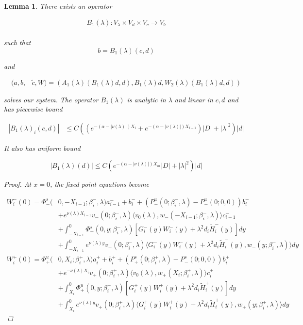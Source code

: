 \documentclass[12pt]{article}
\newtheorem{lemma}{Lemma}
\begin{document}
\begin{lemma}\label{inv3}
There exists an operator

\begin{align*}
B_1(\lambda): V_\lambda \times V_d \times V_c \rightarrow V_b \\
\end{align*}

such that 
\[
b = B_1(\lambda)(c, d)
\]

and

\begin{align*}
(a,b,&\tilde{c}, W) 
= (A_1(\lambda)(B_1(\lambda)d, d), B_1(\lambda)d, W_2(\lambda)(B_1(\lambda)d, d))
\end{align*}

solves our system. The operator $B_1(\lambda)$ is analytic in $\lambda$ and linear in $c, d$ and has piecewise bound

\begin{align*}
|B_1(\lambda)_i(c, d)| &\leq C ( (e^{-(\alpha - |\nu(\lambda)|) X_i} + e^{-(\alpha - |\nu(\lambda)|) X_{i-1}} ) |D| + |\lambda|^2 )|d|
\end{align*}

It also has uniform bound

\begin{equation}
|B_1(\lambda)(d)| \leq C ( e^{-(\alpha - |\nu(\lambda)|) X_m} |D| + |\lambda|^2 )|d|
\end{equation}

\begin{proof}

At $x = 0$, the fixed point equations become

\begin{align*}
W_i^-(0) = \Phi^s_-(&0, -X_{i-1}; \beta_i^-, \lambda)a_{i-1}^- + b_i^- + (P^u_-(0; \beta_i^-, \lambda) - P^u_-(0; 0, 0))b_i^- \\
&+ e^{\nu(\lambda)X_{i-1}} v_-(0; \beta_i^-, \lambda) \langle v_0(\lambda), w_-(-X_{i-1}; \beta_i^-, \lambda) \rangle c_{i-1}^- \\
&+ \int_{-X_{i-1}}^0 \Phi^s_-(0, y; \beta_i^-, \lambda) [ G_i^-(y)W_i^-(y) + \lambda^2 d_i \tilde{H}_i^-(y) ] dy \\
&+ \int_{-X_{i-1}}^0
e^{\nu(\lambda)y} v_-(0; \beta_i^-, \lambda) \langle G_i^-(y)W_i^-(y) + \lambda^2 d_i \tilde{H}_i^-(y), w_-(y; \beta_i^-, \lambda) \rangle dy \\
W_i^+(0) = \Phi^u_+(&0, X_i; \beta_i^+, \lambda)a_i^+ + b_i^+ + (P^s_+(0; \beta_i^+, \lambda) - P^s_-(0; 0, 0))b_i^+ \\
&+ e^{-\nu(\lambda) X_i} v_+(0; \beta_i^+, \lambda) \langle v_0(\lambda), w_+(X_i; \beta_i^+, \lambda) \rangle c_i^+ \\
&+ \int_{X_i}^0 \Phi^u_+(0, y; \beta_i^+, \lambda) [ G_i^+(y)W_i^+(y) + \lambda^2 d_i \tilde{H}_i^+(y) ] dy \\
&+ \int_{X_i}^0 e^{\nu(\lambda)y} v_+(0; \beta_i^+, \lambda) \langle G_i^+(y)W_i^+(y) + \lambda^2 d_i \tilde{H}_i^+(y), w_+(y; \beta_i^+, \lambda) \rangle dy
\end{align*}


\end{proof}
\end{lemma}
\end{document}
